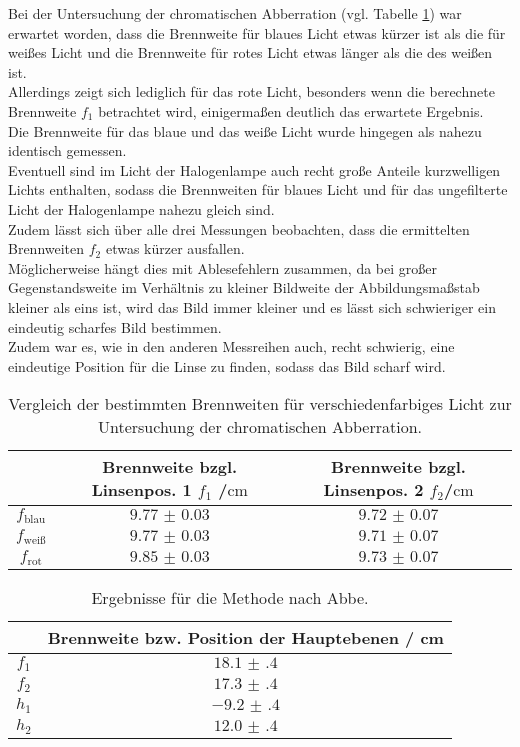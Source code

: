 Bei der Untersuchung der chromatischen Abberration (vgl. Tabelle \ref{tab:chroma}) war erwartet worden, dass die Brennweite für blaues Licht etwas kürzer ist als die für weißes Licht und die Brennweite für rotes Licht etwas länger als die des weißen ist.\\
Allerdings zeigt sich lediglich für das rote Licht, besonders wenn die berechnete Brennweite $f_\mathrm{1}$ betrachtet wird, einigermaßen deutlich das erwartete Ergebnis.
\\Die Brennweite für das blaue und das weiße Licht wurde hingegen als nahezu identisch gemessen.
\\Eventuell sind im Licht der Halogenlampe auch recht große Anteile kurzwelligen Lichts enthalten, sodass die Brennweiten für blaues Licht und für das ungefilterte Licht der Halogenlampe nahezu gleich sind.
\\ Zudem lässt sich über alle drei Messungen beobachten, dass die ermittelten Brennweiten $f_\mathrm{2}$ etwas kürzer ausfallen. \\Möglicherweise hängt dies mit Ablesefehlern zusammen, da bei großer Gegenstandsweite im Verhältnis zu kleiner Bildweite der Abbildungsmaßstab kleiner als eins ist, wird das Bild immer kleiner und es lässt sich schwieriger ein eindeutig scharfes Bild bestimmen.
\\Zudem war es, wie in den anderen Messreihen auch, recht schwierig, eine eindeutige Position für die Linse zu finden, sodass das Bild scharf wird.

\begin{table}
  \centering
  \caption{Vergleich der bestimmten Brennweiten für verschiedenfarbiges Licht zur Untersuchung der chromatischen Abberration.}
  \label{tab:chroma}
  \begin{tabular}{ccc}
    \toprule
    &Brennweite bzgl. Linsenpos. 1 $f_\mathrm{1}$ /$\si{\centi\meter}$&Brennweite bzgl. Linsenpos. 2 $f_\mathrm{2}$/$\si{\centi\meter}$\\
    \midrule
    $f_{\mathrm{blau}}$&$\num{9.77(3)}$&$\num{9.72(7)}$\\
    $f_{\mathrm{weiß}}$&$\num{9.77(3)}$&$\num{9.71(7)}$\\
    $f_{\mathrm{rot}}$&$\num{9.85(3)}$&$\num{9.73(7)}$\\
\bottomrule
\end{tabular}
\end{table}

\begin{table}
  \centering
  \caption{Ergebnisse für die Methode nach Abbe.}
  \label{tab:diskus}
  \begin{tabular}{cc}
    \toprule
	  & Brennweite bzw. Position der Hauptebenen / \si{\centi\meter} \\
    \midrule
	$f_{1}$ & $\num{18.1(4)}$ \\
	$f_{2}$ & $\num{17.3(4)}$ \\
	$h_1$ & $-\num{9.2(4)}$ \\
	$h_2$ & $\num{12.0(4)}$ \\
\bottomrule
\end{tabular}
\end{table}



